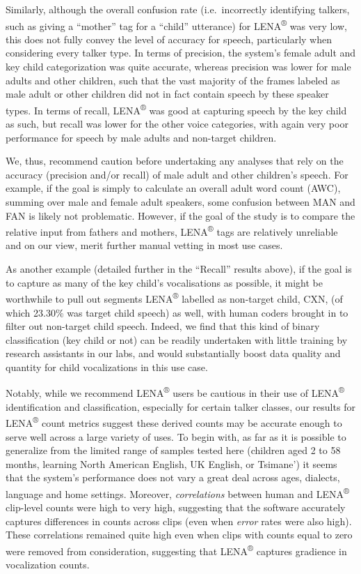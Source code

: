 \documentclass[english,table,man,floatsintext]{apa6}
\begin{document}
Similarly, although the overall confusion rate (i.e.~incorrectly identifying talkers, such as giving a \enquote{mother} tag for a \enquote{child} utterance) for LENA\textsuperscript{®} was very low, this does not fully convey the level of accuracy for speech, particularly when considering every talker type. In terms of precision, the system's female adult and key child categorization was quite accurate, whereas precision was lower for male adults and other children, such that the vast majority of the frames labeled as male adult or other children did not in fact contain speech by these speaker types. In terms of recall, LENA\textsuperscript{®} was good at capturing speech by the key child as such, but recall was lower for the other voice categories, with again very poor performance for speech by male adults and non-target children.

We, thus, recommend caution before undertaking any analyses that rely on the accuracy (precision and/or recall) of male adult and other children's speech. For example, if the goal is simply to calculate an overall adult word count (AWC), summing over male and female adult speakers, some confusion between MAN and FAN is likely not problematic. However, if the goal of the study is to compare the relative input from fathers and mothers, LENA\textsuperscript{®} tags are relatively unreliable and on our view, merit further manual vetting in most use cases.

As another example (detailed further in the \enquote{Recall} results above), if the goal is to capture as many of the key child's vocalisations as possible, it might be worthwhile to pull out segments LENA\textsuperscript{®} labelled as non-target child, CXN, (of which 23.30\% was target child speech) as well, with human coders brought in to filter out non-target child speech. Indeed, we find that this kind of binary classification (key child or not) can be readily undertaken with little training by research assistants in our labs, and would substantially boost data quality and quantity for child vocalizations in this use case.

Notably, while we recommend LENA\textsuperscript{®} users be cautious in their use of LENA\textsuperscript{®} identification and classification, especially for certain talker classes, our results for LENA\textsuperscript{®} count metrics suggest these derived counts may be accurate enough to serve well across a large variety of uses. To begin with, as far as it is possible to generalize from the limited range of samples tested here (children aged 2 to 58 months, learning North American English, UK English, or Tsimane') it seems that the system's performance does not vary a great deal across ages, dialects, language and home settings. Moreover, \emph{correlations} between human and LENA\textsuperscript{®} clip-level counts were high to very high, suggesting that the software accurately captures differences in counts across clips (even when \emph{error} rates were also high). These correlations remained quite high even when clips with counts equal to zero were removed from consideration, suggesting that LENA\textsuperscript{®} captures gradience in vocalization counts.
\end{document}
